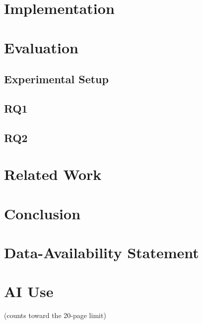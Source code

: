 \documentclass[acmsmall,screen,review,anonymous,nonacm]{acmart}
\begin{document}
\section{Implementation}
  \label{sec:impl}

\section{Evaluation}
  \label{sec:eval}
  \subsection{Experimental Setup}
    \label{sec:setup}
  \subsection{RQ1}
    \label{sec:rq1}
  \subsection{RQ2}
    \label{sec:rq2}

\section{Related Work}
  \label{sec:related}

\section{Conclusion}
  \label{sec:conclusion}

\section*{Data-Availability Statement}

\section*{AI Use}
  (counts toward the 20-page limit)



\end{document}
